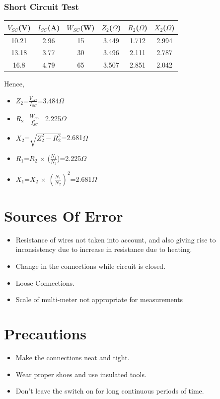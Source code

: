 \documentclass{article}
\begin{document}
\subsubsection{Short Circuit Test}
\vspace{1mm}
\begin{center}
    \begin{tabular}{|c|c|c|c|c|c|}
\hline
    $V_{SC}$(V) & $I_{SC}$(A) & $W_{SC}$(W) & $Z_{2}$($\Omega$) & $R_{2}$($\Omega$) & $X_{2}$($\Omega$)\\
    \hline
    10.21 & 2.96 & 15 & 3.449 & 1.712 & 2.994\\
    13.18 & 3.77 & 30 & 3.496 & 2.111 & 2.787\\
    16.8 & 4.79 & 65 & 3.507 & 2.851 & 2.042\\
\hline
\end{tabular}
\end{center}
\vspace{3mm}
Hence,
\begin{itemize}
    \item $Z_{2}$=$\frac{V_{SC}}{I_{SC}}$=3.484$\Omega$
    \item $R_{2}$=$\frac{W_{SC}}{I_{SC}^2}$=2.225$\Omega$
    \item $X_{2}$=$\sqrt{Z_{2}^2 - R_{2}^2}$=2.681$\Omega$
    \item $R_{1}$=$R_{2}$ $\times$ ($\frac{N_{1}}{N_{2}}$)=2.225$\Omega$
    \item $X_{1}$=$X_{2}$ $\times$ $(\frac{N_{1}}{N_{2}})^2$=2.681$\Omega$
\end{itemize}

\section{Sources Of Error}
\begin{itemize}
    \item Resistance of wires not taken into account, and also giving rise to inconsistency due to increase in resistance due to heating.
    \item Change in the connections while circuit is closed.
    \item Loose Connections.
    \item Scale of multi-meter not appropriate for measurements
\end{itemize}
\section{Precautions}
\begin{itemize}
    \item Make the connections neat and tight.
    \item Wear proper shoes and use insulated tools.
    \item Don’t leave the switch on for long continuous periods of time.
\end{itemize}
\end{document}
